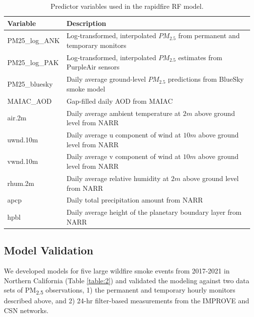\documentclass[gmd, manuscript]{copernicus}
\begin{document}
\begin{table}[h]
\caption{Predictor variables used in the rapidfire RF model.}
\begin{tabular}{ll}
Variable       & Description                                                                    \\ \hline
PM25\_log\_ANK & Log-transformed, interpolated $PM_{2.5}$ from permanent and temporary monitors \\
PM25\_log\_PAK & Log-transformed, interpolated $PM_{2.5}$ estimates from PurpleAir sensors      \\
PM25\_bluesky  & Daily average ground-level $PM_{2.5}$ predictions from BlueSky smoke model     \\
MAIAC\_AOD     & Gap-filled  daily AOD from MAIAC                                               \\
air.2m         & Daily average ambient temperature at $2\unit{m}$ above ground level from NARR  \\
uwnd.10m       & Daily average u component of wind at $10\unit{m}$ above ground level from NARR \\
vwnd.10m       & Daily average v component of wind at $10\unit{m}$ above ground level from NARR \\
rhum.2m        & Daily average relative humidity at $2\unit{m}$ above ground level from NARR    \\
apcp           & Daily total precipitation amount from NARR                                     \\
hpbl           & Daily average height of the planetary boundary layer from NARR                
\end{tabular}
\label{table:1}
\end{table}

\subsection{Model Validation}

We developed models for five large wildfire smoke events from 2017-2021
in Northern California (Table \ref{table:2}) and validated the modeling
against two data sets of PM\textsubscript{2.5} observations, 1) the
permanent and temporary hourly monitors described above, and 2) 24-hr
filter-based measurements from the IMPROVE and CSN networks.
\end{document}
